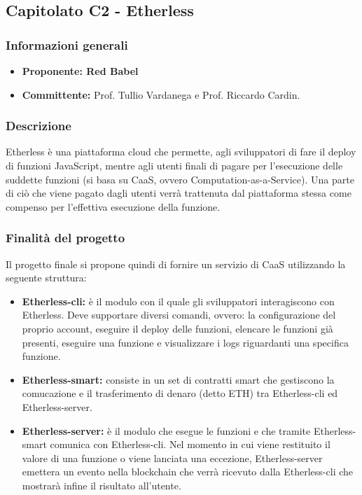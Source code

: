 

    \subsection{Capitolato C2 - Etherless}
       \subsubsection{Informazioni generali}
       \begin{itemize}
           \item \textbf{Proponente: Red Babel}
           \item \textbf{Committente: }Prof. Tullio Vardanega e Prof. Riccardo Cardin.
       \end{itemize}

    \subsubsection{Descrizione}
       Etherless è una piattaforma cloud che permette, agli sviluppatori di fare il deploy di funzioni JavaScript, mentre  agli utenti finali di pagare per l'esecuzione delle suddette funzioni (si basa su CaaS, ovvero Computation-as-a-Service).
       Una parte di ciò che viene pagato dagli utenti verrà trattenuta dal piattaforma stessa come compenso per l'effettiva esecuzione della funzione. 
    \subsubsection{Finalità del progetto}
     Il progetto finale si propone quindi di fornire un servizio di CaaS utilizzando la seguente struttura:
     \begin{itemize}
    		\item \textbf{Etherless-cli: }è il modulo con il quale gli sviluppatori interagiscono con Etherless. Deve supportare diversi comandi, ovvero: la configurazione del proprio account, eseguire il deploy delle funzioni, elencare le funzioni già presenti, eseguire una funzione e visualizzare i logs riguardanti una specifica funzione.
    		\item \textbf{Etherless-smart: }consiste in un set di contratti smart che gestiscono la comucazione e il trasferimento di denaro (detto ETH) tra Etherless-cli ed Etherless-server.
    		\item \textbf{Etherless-server: }è il modulo che esegue le funzioni e che tramite Etherless-smart comunica con Etherless-cli.  Nel momento in cui viene restituito il valore di una funzione o viene lanciata una eccezione, Etherless-server  emettera un evento nella blockchain che verrà ricevuto dalla Etherless-cli che mostrarà infine il risultato all'utente. 
	\end{itemize}      
